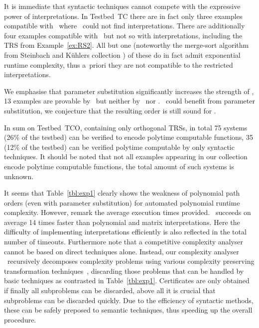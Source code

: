 \documentclass{LMCS}
\begin{document}
It is immediate that syntactic techniques cannot compete with the expressive 
power of interpretations. 
In Testbed~\textsf{TC} there are in fact only three examples 
compatible with \POPSTARP\ where \TCT~could not find interpretations.
There are additionally four examples compatible with \LMPO\ but not so with interpretations, 
including the TRS  from Example~\ref{ex:RS2}. 
All but one (noteworthy the merge-sort algorithm from Steinbach and K\"uhlers collection 
\cite[Example~2.43]{SK90}) 
of these do in fact admit exponential runtime complexity, 
thus a~priori they are not compatible to the restricted interpretations.


We emphasise that parameter substitution significantly increases the strength of 
\POPSTAR, 13 examples are provable by \POPSTARP\ but neither by \POPSTAR\ nor \LMPO.\@
\LMPO\ could benefit from parameter substitution, 
we conjecture that the resulting order is still sound for . 

In sum on Testbed~\textsf{TCO}, containing only orthogonal TRSs, 
in total 75 systems (26\% of the testbed)
can be verified to encode polytime computable functions, 35 (12\% of the testbed)
can be verified polytime computable by only syntactic techniques. 
It should be noted that not all examples appearing in our collection encode polytime computable 
functions, the total amount of such systems is unknown. 

It seems that Table~\ref{tbl:exp1} clearly shows the weakness of polynomial
path orders (even with parameter substitution) for automated polynomial
runtime complexity. However, remark the average execution times provided.
\POPSTARP\ succeeds on average 14 times faster than polynomial and 
matrix interpretations. Here the difficulty of implementing interpretations efficiently 
is also reflected in the total number of timeouts.
Furthermore note that a competitive complexity
analyser cannot be based on direct techniques alone. 
Instead, our complexity analyser \TCT\ recursively decomposes complexity problems using 
various complexity preserving transformation techniques~\cite{AM13}, 
discarding those problems that can be handled by basic techniques as 
contrasted in Table~\ref{tbl:exp1}.
Certificates are only obtained
if finally all subproblems can be discarded,
above all it is crucial that subproblems can be discarded 
quickly. Due to the efficiency of syntactic methods, these 
can be safely preposed to semantic techniques, thus speeding up the overall procedure.
\end{document}
